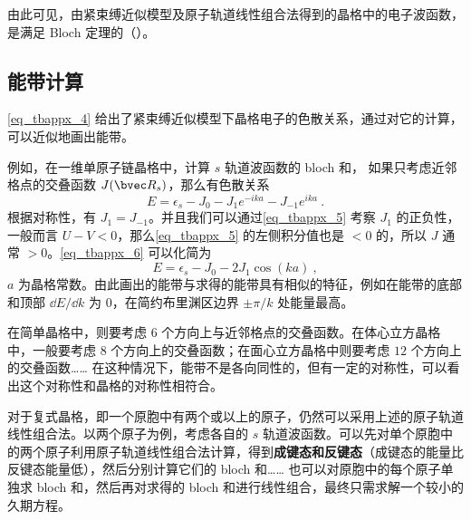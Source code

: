 由此可见，由紧束缚近似模型及原子轨道线性组合法得到的晶格中的电子波函数，是满足 Bloch 定理的（）。

\subsection{能带计算}
\autoref{eq_tbappx_4} 给出了紧束缚近似模型下晶格电子的色散关系，通过对它的计算，可以近似地画出能带。

例如，在一维单原子链晶格中，计算 $s$ 轨道波函数的 bloch 和， 如果只考虑近邻格点的交叠函数 $J(\bvec R_s)$，那么有色散关系
\begin{equation}\label{eq_tbappx_6}
E=\epsilon_s-J_0-J_1 e^{-i k a}-J_{-1}e^{ika}~.
\end{equation}
根据对称性，有 $J_1=J_{-1}$。并且我们可以通过\autoref{eq_tbappx_5} 考察 $J_1$ 的正负性，一般而言 $U-V<0$，那么\autoref{eq_tbappx_5} 的左侧积分值也是 $<0$ 的，所以 $J$ 通常 $>0$。\autoref{eq_tbappx_6} 可以化简为
\begin{equation}
E=\epsilon_s-J_0-2J_1\cos(ka)~,
\end{equation}
$a$ 为晶格常数。由此画出的能带与求得的能带具有相似的特征，例如在能带的底部和顶部 $\dd E/\dd k$ 为 $0$，在简约布里渊区边界 $\pm \pi/k$ 处能量最高。

在简单晶格中，则要考虑 $6$ 个方向上与近邻格点的交叠函数。在体心立方晶格中，一般要考虑 $8$ 个方向上的交叠函数；在面心立方晶格中则要考虑 $12$ 个方向上的交叠函数…… 在这种情况下，能带不是各向同性的，但有一定的对称性，可以看出这个对称性和晶格的对称性相符合。

对于复式晶格，即一个原胞中有两个或以上的原子，仍然可以采用上述的原子轨道线性组合法。以两个原子为例，考虑各自的 $s$ 轨道波函数。可以先对单个原胞中的两个原子利用原子轨道线性组合法计算，得到\textbf{成键态和反键态}（成键态的能量比反键态能量低），然后分别计算它们的 bloch 和…… 也可以对原胞中的每个原子单独求 bloch 和，然后再对求得的 bloch 和进行线性组合，最终只需求解一个较小的久期方程。
